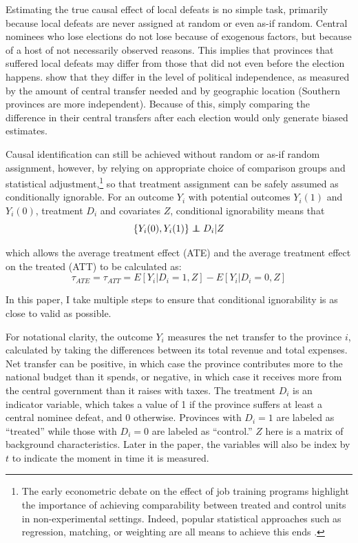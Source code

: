 \documentclass[12pt]{article}\usepackage[]{graphicx}\usepackage[]{color}
\newcommand{\1}{\mathbbm{1}}
\newcommand\indep{\protect\mathpalette{\protect\independenT}{\perp}}
\def\independenT#1#2{\mathrel{\rlap{$#1#2$}\mkern2mu{#1#2}}}
\begin{document}
Estimating the true causal effect of local defeats is no simple task, primarily because local defeats are never assigned at random or even as-if random. Central nominees who lose elections do not lose because of exogenous factors, but because of a host of not necessarily observed reasons. This implies that provinces that suffered local defeats may differ from those that did not even before the election happens. \cite{MaleskySchuler2011} show that they differ in the level of political independence, as measured by the amount of central transfer needed and by geographic location (Southern provinces are more independent). Because of this, simply comparing the difference in their central transfers after each election would only generate biased estimates.

Causal identification can still be achieved without random or as-if random assignment, however, by relying on appropriate choice of comparison groups and statistical adjustment,\footnote{The early econometric debate on the effect of job training programs highlight the importance of achieving comparability between treated and control units in non-experimental settings. Indeed, popular statistical approaches such as regression, matching, or weighting are all means to achieve this ends \citep{Ashenfelter1978, AshenfelterCard1985, Lalonde1986, DehejiaWahba1999}.} so that treatment assignment can be safely assumed as conditionally ignorable. For an outcome $Y_i$ with potential outcomes $Y_i(1)$ and $Y_i(0)$, treatment $D_i$ and covariates $Z$, conditional ignorability means that
$$
	\{Y_i(0), Y_i(1)\} \indep D_i | Z
$$

which allows the average treatment effect (ATE) and the average treatment effect on the treated (ATT) to be calculated as:
$$
	\tau_{ATE} = \tau_{ATT} = E[Y_i | D_i = 1, Z] - E[Y_i | D_i = 0, Z]
$$

In this paper, I take multiple steps to ensure that conditional ignorability is as close to valid as possible. 

For notational clarity, the outcome $Y_i$ measures the net transfer to the province $i$, calculated by taking the differences between its total revenue and total expenses. Net transfer can be positive, in which case the province contributes more to the national budget than it spends, or negative, in which case it receives more from the central government than it raises with taxes. The treatment $D_i$ is an indicator variable, which takes a value of 1 if the province suffers at least a central nominee defeat, and 0 otherwise. Provinces with $D_i=1$ are labeled as ``treated'' while those with $D_i=0$ are labeled as ``control.'' $Z$ here is a matrix of background characteristics. Later in the paper, the variables will also be index by $t$ to indicate the moment in time it is measured.
\end{document}
